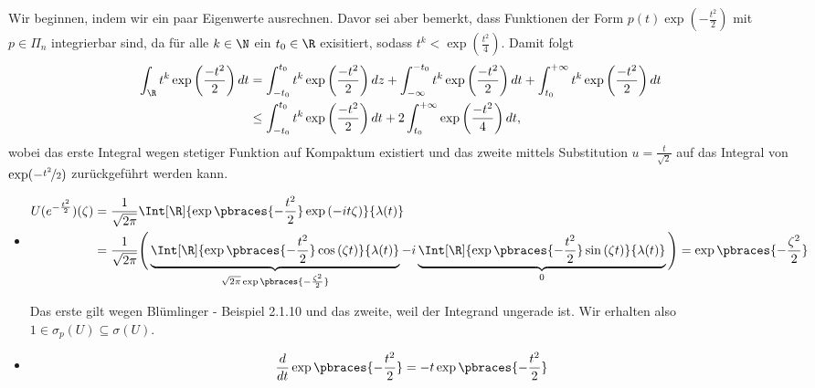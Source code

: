 \begin{solution}

Wir beginnen, indem wir ein paar Eigenwerte ausrechnen.
Davor sei aber bemerkt, dass Funktionen der Form $p(t)\exp(-\frac{t^2}{2})$ mit $p \in \Pi_n$ integrierbar sind, da für alle $k \in \N$
ein $t_0 \in \R$ exisitiert, sodass $t^k < \exp(\frac{t^2}{4})$. Damit folgt
\begin{align*}
  \int_\R t^k \exp\left(\frac{-t^2}{2}\right) dt &= \int_{-t_0}^{t_0} t^k \exp\left(\frac{-t^2}{2}\right) dz
  + \int_{-\infty}^{-t_0} t^k \exp\left(\frac{-t^2}{2}\right) dt + \int_{t_0}^{+\infty} t^k \exp\left(\frac{-t^2}{2}\right) dt\\
  &\leq \int_{-t_0}^{t_0} t^k \exp\left(\frac{-t^2}{2}\right) dt + 2\int_{t_0}^{+\infty}\exp\left(\frac{-t^2}{4}\right)  dt,
\end{align*}
wobei das erste Integral wegen stetiger Funktion auf Kompaktum existiert und
das zweite mittels Substitution $u = \frac{t}{\sqrt{2}}$ auf das Integral von $\exp(-\nicefrac{t^2}{2})$
zurückgeführt werden kann.
\FloatBarrier
\begin{itemize}
  \item
  \begin{align*}
    U(e^{-\frac{t^2}{2}})(\zeta)
    & =
    \frac{1}{\sqrt{2 \pi}}
    \Int[\R]
    {
      \exp \pbraces{-\frac{t^2}{2}}
      \exp{(-i t \zeta)}
    }
    {\lambda(t)} \\
    & =
    \frac{1}{\sqrt{2 \pi}}
    \Bigg (
      \underbrace
      {
      \Int[\R]
      {
      \exp \pbraces{-\frac{t^2}{2}}
      \cos{(\zeta t)}
      }
      {\lambda(t)}
      }_{
      \sqrt{2 \pi}
      \exp \pbraces{-\frac{\zeta^2}{2}}
      } -
      i
      \underbrace
      {
      \Int[\R]
      {
      \exp \pbraces{-\frac{t^2}{2}}
      \sin{(\zeta t)}
      }
      {\lambda(t)}
      }_0
    \Bigg )
    =
    \exp \pbraces{-\frac{\zeta^2}{2}}
  \end{align*}

  Das erste  gilt wegen Blümlinger - Beispiel 2.1.10 und das zweite, weil der Integrand ungerade ist.
  Wir erhalten also $1 \in \sigma_p(U) \subseteq \sigma(U)$.
  \FloatBarrier
  \FloatBarrier
  \item
  \begin{align*}
    \frac{d}{dt}
    \exp \pbraces{-\frac{t^2}{2}}
    =
    -t \exp \pbraces{-\frac{t^2}{2}}
  \end{align*}




\end{itemize}
\end{solution}
